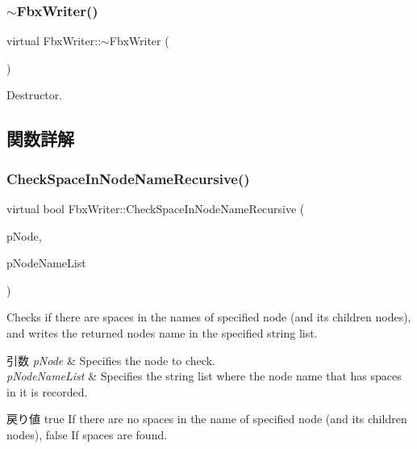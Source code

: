 \subsubsection{\texorpdfstring{$\sim$\+Fbx\+Writer()}{~FbxWriter()}}
{\footnotesize\ttfamily virtual Fbx\+Writer\+::$\sim$\+Fbx\+Writer (\begin{DoxyParamCaption}{ }\end{DoxyParamCaption})\hspace{0.3cm}{\ttfamily [virtual]}}

Destructor. 

\subsection{関数詳解}
\mbox{\label{class_fbx_writer_a9db05cf879a056dce01c960559cee27b}} 
\subsubsection{\texorpdfstring{Check\+Space\+In\+Node\+Name\+Recursive()}{CheckSpaceInNodeNameRecursive()}}
{\footnotesize\ttfamily virtual bool Fbx\+Writer\+::\+Check\+Space\+In\+Node\+Name\+Recursive (\begin{DoxyParamCaption}\item[{\hyperlink{class_fbx_node}{Fbx\+Node} $\ast$}]{p\+Node,  }\item[{\hyperlink{class_fbx_string}{Fbx\+String} \&}]{p\+Node\+Name\+List }\end{DoxyParamCaption})\hspace{0.3cm}{\ttfamily [virtual]}}

Checks if there are spaces in the names of specified node (and its children nodes), and writes the returned node\textquotesingle{}s name in the specified string list. 
\begin{DoxyParams}{引数}
{\em p\+Node} & Specifies the node to check. \\
\hline
{\em p\+Node\+Name\+List} & Specifies the string list where the node name that has spaces in it is recorded. \\
\hline
\end{DoxyParams}
\begin{DoxyReturn}{戻り値}
{\ttfamily true} If there are no spaces in the name of specified node (and its children nodes), {\ttfamily false} If spaces are found. 
\end{DoxyReturn}
\mbox{\label{class_fbx_writer_a0387142f55d0020fd5360759c12aa121}} 
